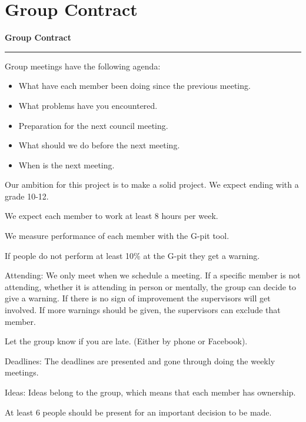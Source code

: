 \section{Group Contract}
\label{app:groupContract}
\begin{center}
{\Large \bfseries Group Contract }
\rule{\textwidth}{0.5mm}
\end{center}

Group meetings have the following agenda:
\begin{itemize}
 \item What have each member been doing since the previous meeting.
 \item What problems have you encountered.
 \item Preparation for the next council meeting.
 \item What should we do before the next meeting.
 \item When is the next meeting.
\end{itemize}

Our ambition for this project is to make a solid project.
We expect ending with a grade 10-12.

We expect each member to work at least 8 hours per week.

We measure performance of each member with the G-pit tool.

If people do not perform at least 10\% at the G-pit they get a warning.

Attending: We only meet when we schedule a meeting. 
If a specific member is not attending, whether it is attending in person or mentally, the group can decide to give a warning.
If there is no sign of improvement the supervisors will get involved. If more warnings should be given, the supervisors can exclude that member.

Let the group know if you are late. (Either by phone or Facebook).

Deadlines: The deadlines are presented and gone through doing the weekly meetings.

Ideas: Ideas belong to the group, which means that each member has ownership.

At least 6 people should be present for an important decision to be made.